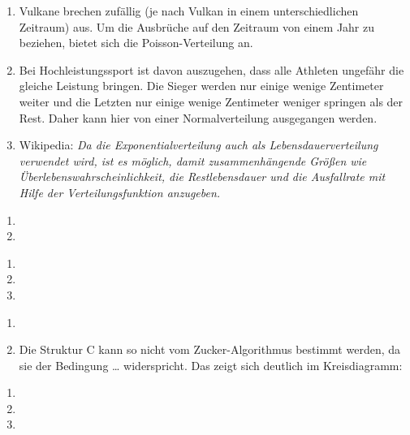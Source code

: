 \documentclass{homework}
\date{Montag, dem 14. Januar 2013}
\author{Stefan Meißner (4279113) und Niels Hoppe (4356370)}
\begin{document}
\maketitle
\begin{enumerate} 

\begin{enumerate}
\item 
Vulkane brechen zufällig (je nach Vulkan in einem unterschiedlichen Zeitraum) aus. 
Um die Ausbrüche auf den Zeitraum von einem Jahr zu beziehen, bietet sich die Poisson-Verteilung an.
\item 
Bei Hochleistungssport ist davon auszugehen, dass alle Athleten ungefähr die gleiche Leistung bringen.
Die Sieger werden nur einige wenige Zentimeter weiter und die Letzten nur einige wenige Zentimeter weniger springen als der Rest.
Daher kann hier von einer Normalverteilung ausgegangen werden.
\item
Wikipedia: \textit{Da die Exponentialverteilung auch als Lebensdauerverteilung verwendet wird, ist es möglich,
damit zusammenhängende Größen wie Überlebenswahrscheinlichkeit,
die Restlebensdauer und die Ausfallrate mit Hilfe der Verteilungsfunktion anzugeben.} \\
\end{enumerate}


\begin{enumerate}
\item
\item
\end{enumerate}

\begin{enumerate}
\item
\item
\item
\end{enumerate}

\begin{enumerate}
\item
\item
Die Struktur C kann so nicht vom Zucker-Algorithmus bestimmt werden,
da sie der Bedingung \ldots %
widerspricht. Das zeigt sich deutlich im Kreisdiagramm:

\end{enumerate}

\begin{enumerate}
\item
\item
\item
\end{enumerate}

\end{enumerate}
\end{document}
